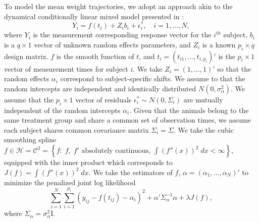 \documentclass[12pt]{article}
\newcommand{\hilbert}{\mathcal{H}}
\begin{document}
To model the mean weight trajectories, we adopt an approach akin to the dynamical conditionally linear mixed model presented in \cite{pourahmadi2002dynamic}:
\begin{equation}
Y_i = f\left(t_i  \right) + Z_i b_i + \epsilon^*_i, \quad i = 1, \dots, N,
\end{equation} 
\noindent
where $Y_i$ is the measurement corresponding response vector for the $i^{th}$ subject, $b_i$ is a $q \times 1$ vector of unknown random effects parameters, and $Z_i$ is a known $p_i \times q$ design matrix.  $f$ is the smooth function of $t$, and $t_i = \left(t_{i1}, \dots, t_{i,p_i}\right)'$ is the $p_i \times 1$ vector of measurement times for subject $i$. We take $Z_i = \left(1 , \dots, 1\right)'$ so that the random effects $\alpha_i$ correspond to subject-specific shifts. We assume to that the random intercepts are independent and identically distributed $N\left(0,\sigma_\alpha^2\right)$. We assume that the $p_i \times 1$ vector of residuals $\epsilon^*_i \sim N\left(0, \Sigma_i\right)$ are mutually independent of the random intercepts $\alpha_i$. Given that the animals belong to the same treatment group and share a common set of observation times, we assume each subject shares common covariance matrix $\Sigma_i = \Sigma$. We take the cubic smoothing spline  $f \in \hilbert = \mathcal{C}^2 = \left\{f: \; f,\;f' \mbox{ absolutely continuous, } \int\left(f''\left(x\right)\right)^2 \;dx < \infty  \right\}$, equipped with the inner product which corresponds to $J\left(f\right) = \int \left(f''\left(x\right)\right)^2\;dx$. We take the estimators of $f$, $\alpha = \left(\alpha_1,\dots, \alpha_N\right)'$ to minimize the penalized joint log likelihood
\begin{equation}
\sum_{i = 1}^N \sum_{i = 1}^{p_i} \left(y_{ij} - f\left(t_{ij} \right) - \alpha_i \right)^2 + \alpha' \Sigma_\alpha^{-1} \alpha + \lambda J \left(f\right),
\end{equation}
\noindent
where $\Sigma_\alpha = \sigma_\alpha^2 \mathrm{I}$. 
\end{document}
